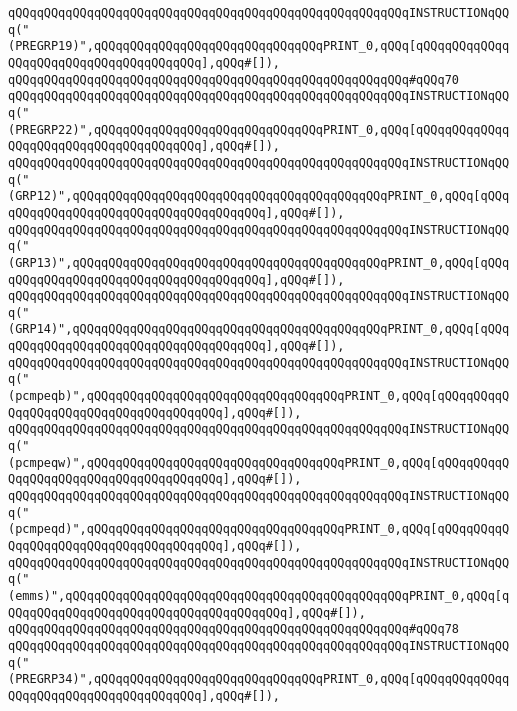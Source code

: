\verb|qQQqqQQqqQQqqQQqqQQqqQQqqQQqqQQqqQQqqQQqqQQqqQQqqQQqqQQqINSTRUCTIONqQQq("(PREGRP19)",qQQqqQQqqQQqqQQqqQQqqQQqqQQqqQQqPRINT_0,qQQq[qQQqqQQqqQQqqQQqqQQqqQQqqQQqqQQqqQQqqQQq],qQQq#[]),|\newline
\verb|qQQqqQQqqQQqqQQqqQQqqQQqqQQqqQQqqQQqqQQqqQQqqQQqqQQqqQQq#qQQq70|\newline
\verb|qQQqqQQqqQQqqQQqqQQqqQQqqQQqqQQqqQQqqQQqqQQqqQQqqQQqqQQqINSTRUCTIONqQQq("(PREGRP22)",qQQqqQQqqQQqqQQqqQQqqQQqqQQqqQQqPRINT_0,qQQq[qQQqqQQqqQQqqQQqqQQqqQQqqQQqqQQqqQQqqQQq],qQQq#[]),|\newline
\verb|qQQqqQQqqQQqqQQqqQQqqQQqqQQqqQQqqQQqqQQqqQQqqQQqqQQqqQQqINSTRUCTIONqQQq("(GRP12)",qQQqqQQqqQQqqQQqqQQqqQQqqQQqqQQqqQQqqQQqqQQqPRINT_0,qQQq[qQQqqQQqqQQqqQQqqQQqqQQqqQQqqQQqqQQqqQQq],qQQq#[]),|\newline
\verb|qQQqqQQqqQQqqQQqqQQqqQQqqQQqqQQqqQQqqQQqqQQqqQQqqQQqqQQqINSTRUCTIONqQQq("(GRP13)",qQQqqQQqqQQqqQQqqQQqqQQqqQQqqQQqqQQqqQQqqQQqPRINT_0,qQQq[qQQqqQQqqQQqqQQqqQQqqQQqqQQqqQQqqQQqqQQq],qQQq#[]),|\newline
\verb|qQQqqQQqqQQqqQQqqQQqqQQqqQQqqQQqqQQqqQQqqQQqqQQqqQQqqQQqINSTRUCTIONqQQq("(GRP14)",qQQqqQQqqQQqqQQqqQQqqQQqqQQqqQQqqQQqqQQqqQQqPRINT_0,qQQq[qQQqqQQqqQQqqQQqqQQqqQQqqQQqqQQqqQQqqQQq],qQQq#[]),|\newline
\verb|qQQqqQQqqQQqqQQqqQQqqQQqqQQqqQQqqQQqqQQqqQQqqQQqqQQqqQQqINSTRUCTIONqQQq("(pcmpeqb)",qQQqqQQqqQQqqQQqqQQqqQQqqQQqqQQqqQQqPRINT_0,qQQq[qQQqqQQqqQQqqQQqqQQqqQQqqQQqqQQqqQQqqQQq],qQQq#[]),|\newline
\verb|qQQqqQQqqQQqqQQqqQQqqQQqqQQqqQQqqQQqqQQqqQQqqQQqqQQqqQQqINSTRUCTIONqQQq("(pcmpeqw)",qQQqqQQqqQQqqQQqqQQqqQQqqQQqqQQqqQQqPRINT_0,qQQq[qQQqqQQqqQQqqQQqqQQqqQQqqQQqqQQqqQQqqQQq],qQQq#[]),|\newline
\verb|qQQqqQQqqQQqqQQqqQQqqQQqqQQqqQQqqQQqqQQqqQQqqQQqqQQqqQQqINSTRUCTIONqQQq("(pcmpeqd)",qQQqqQQqqQQqqQQqqQQqqQQqqQQqqQQqqQQqPRINT_0,qQQq[qQQqqQQqqQQqqQQqqQQqqQQqqQQqqQQqqQQqqQQq],qQQq#[]),|\newline
\verb|qQQqqQQqqQQqqQQqqQQqqQQqqQQqqQQqqQQqqQQqqQQqqQQqqQQqqQQqINSTRUCTIONqQQq("(emms)",qQQqqQQqqQQqqQQqqQQqqQQqqQQqqQQqqQQqqQQqqQQqqQQqPRINT_0,qQQq[qQQqqQQqqQQqqQQqqQQqqQQqqQQqqQQqqQQqqQQq],qQQq#[]),|\newline
\verb|qQQqqQQqqQQqqQQqqQQqqQQqqQQqqQQqqQQqqQQqqQQqqQQqqQQqqQQq#qQQq78|\newline
\verb|qQQqqQQqqQQqqQQqqQQqqQQqqQQqqQQqqQQqqQQqqQQqqQQqqQQqqQQqINSTRUCTIONqQQq("(PREGRP34)",qQQqqQQqqQQqqQQqqQQqqQQqqQQqqQQqPRINT_0,qQQq[qQQqqQQqqQQqqQQqqQQqqQQqqQQqqQQqqQQqqQQq],qQQq#[]),|\newline
